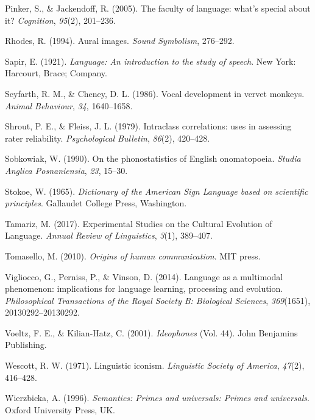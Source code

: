 \documentclass[english,floatsintext,man]{apa6}
\theoremstyle{definition}
\theoremstyle{definition}
\theoremstyle{definition}
\theoremstyle{remark}
\begin{document}
\leavevmode\hypertarget{ref-Pinker:2005cv}{}%
Pinker, S., \& Jackendoff, R. (2005). The faculty of language: what's
special about it? \emph{Cognition}, \emph{95}(2), 201--236.

\leavevmode\hypertarget{ref-Rhodes:1994au}{}%
Rhodes, R. (1994). Aural images. \emph{Sound Symbolism}, 276--292.

\leavevmode\hypertarget{ref-Sapir:1921}{}%
Sapir, E. (1921). \emph{Language: An introduction to the study of
speech}. New York: Harcourt, Brace; Company.

\leavevmode\hypertarget{ref-Seyfarth:1986tw}{}%
Seyfarth, R. M., \& Cheney, D. L. (1986). Vocal development in vervet
monkeys. \emph{Animal Behaviour}, \emph{34}, 1640--1658.

\leavevmode\hypertarget{ref-Shrout:1979tg}{}%
Shrout, P. E., \& Fleiss, J. L. (1979). Intraclass correlations: uses in
assessing rater reliability. \emph{Psychological Bulletin},
\emph{86}(2), 420--428.

\leavevmode\hypertarget{ref-Sobkowiak:1990ph}{}%
Sobkowiak, W. (1990). On the phonostatistics of English onomatopoeia.
\emph{Studia Anglica Posnaniensia}, \emph{23}, 15--30.

\leavevmode\hypertarget{ref-Stokoe:1965}{}%
Stokoe, W. (1965). \emph{Dictionary of the American Sign Language based
on scientific principles}. Gallaudet College Press, Washington.

\leavevmode\hypertarget{ref-Tamariz:2017bd}{}%
Tamariz, M. (2017). Experimental Studies on the Cultural Evolution of
Language. \emph{Annual Review of Linguistics}, \emph{3}(1), 389--407.

\leavevmode\hypertarget{ref-Tomasello:2010or}{}%
Tomasello, M. (2010). \emph{Origins of human communication}. MIT press.

\leavevmode\hypertarget{ref-Vigliocco:2014fc}{}%
Vigliocco, G., Perniss, P., \& Vinson, D. (2014). Language as a
multimodal phenomenon: implications for language learning, processing
and evolution. \emph{Philosophical Transactions of the Royal Society B:
Biological Sciences}, \emph{369}(1651), 20130292--20130292.

\leavevmode\hypertarget{ref-Voeltz:2001vv}{}%
Voeltz, F. E., \& Kilian-Hatz, C. (2001). \emph{Ideophones} (Vol. 44).
John Benjamins Publishing.

\leavevmode\hypertarget{ref-Wescott:1971to}{}%
Wescott, R. W. (1971). Linguistic iconism. \emph{Linguistic Society of
America}, \emph{47}(2), 416--428.

\leavevmode\hypertarget{ref-Wierzbicka:1996sm}{}%
Wierzbicka, A. (1996). \emph{Semantics: Primes and universals: Primes
and universals}. Oxford University Press, UK.


\clearpage
\renewcommand{\listtablename}{Table captions}
\listoftables

\clearpage
\renewcommand{\listfigurename}{Figure captions}
\listoffigures
\end{document}
